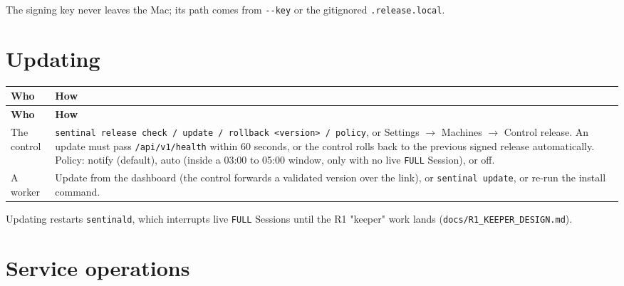 The signing key never leaves the Mac; its path comes from \texttt{-{}\allowbreak{}-{}\allowbreak{}key} or the gitignored \texttt{.\allowbreak{}release.\allowbreak{}local}.

\section{\texorpdfstring{Updating}{Updating}}

\begin{small}
\begin{longtable}{>{\raggedright\arraybackslash}p{0.166\dimexpr \linewidth-4\tabcolsep\relax}>{\raggedright\arraybackslash}p{0.834\dimexpr \linewidth-4\tabcolsep\relax}}
\toprule
\textbf{Who} & \textbf{How} \\
\midrule
\endfirsthead
\toprule
\textbf{Who} & \textbf{How} \\
\midrule
\endhead
The control & \texttt{sentinal\ release\ check\ /\allowbreak{}\ update\ /\allowbreak{}\ rollback\ \textless{}version\textgreater{}\ /\allowbreak{}\ policy}, or Settings $\rightarrow$ Machines $\rightarrow$ Control release. An update must pass \texttt{/\allowbreak{}api/\allowbreak{}v1/\allowbreak{}health} within 60 seconds, or the control rolls back to the previous signed release automatically. Policy: notify (default), auto (inside a 03:00 to 05:00 window, only with no live \texttt{FULL} Session), or off. \\
A worker & Update from the dashboard (the control forwards a validated version over the link), or \texttt{sentinal\ update}, or re-run the install command. \\
\bottomrule
\end{longtable}
\end{small}

Updating restarts \texttt{sentinald}, which interrupts live \texttt{FULL} Sessions until the R1 "keeper" work lands (\texttt{docs/\allowbreak{}R1\_\allowbreak{}KEEPER\_\allowbreak{}DESIGN.\allowbreak{}md}).

\section{\texorpdfstring{Service operations}{Service operations}}


